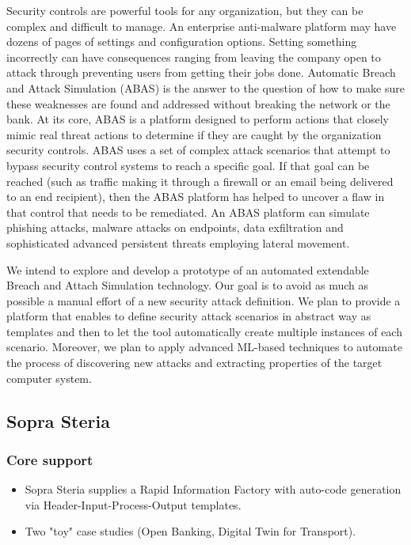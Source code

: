 \documentclass[a4paper,11pt]{article}
\begin{document}
Security controls are powerful tools for any organization, but they can be complex and difficult to manage. An enterprise anti-malware platform may have dozens of pages of settings and configuration options. Setting something incorrectly can have consequences ranging from leaving the company open to attack through preventing users from getting their jobs done.
Automatic Breach and Attack Simulation (ABAS) is the answer to the question of how to make sure these weaknesses are found and addressed without breaking the network or the bank. At its core, ABAS is a platform designed to perform actions that closely mimic real threat actions to determine if they are caught by the organization security controls.
ABAS uses a set of complex attack scenarios that attempt to bypass security control systems to reach a specific goal. If that goal can be reached (such as traffic making it through a firewall or an email being delivered to an end recipient), then the ABAS platform has helped to uncover a flaw in that control that needs to be remediated. An ABAS platform can simulate phishing attacks, malware attacks on endpoints, data exfiltration and sophisticated advanced persistent threats employing lateral movement.

We intend to explore and develop a prototype of an automated extendable Breach and Attach Simulation technology. Our goal is to avoid as much as possible a manual effort of a new security attack definition. We plan to provide a platform that enables to define security attack scenarios in abstract way as templates and then to let the tool automatically create multiple instances of each scenario. Moreover, we plan to apply advanced ML-based techniques to automate the process of discovering new attacks and extracting properties of the target computer system.



\subsection{Sopra Steria}
\subsubsection{Core support}
\begin{itemize}
    \item Sopra Steria supplies a Rapid Information Factory with auto-code generation via Header-Input-Process-Output templates.
    \item Two "toy" case studies (Open Banking, Digital Twin for Transport).
\end{itemize}
\end{document}
